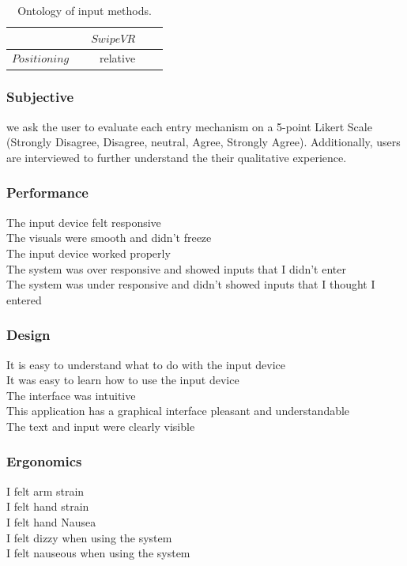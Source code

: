 \begin{table}\centering
{}
\begin{tabular}{@{}rrrrr@{}}\toprule
            &             & $SwipeVR$  \\
\midrule
$Positioning$     &             & relative        \\


\bottomrule
\end{tabular}
\caption{Ontology of input methods.}
\label{table:usability}
\end{table}


\subsubsection{Subjective }
we ask the user to evaluate each entry mechanism on a 5-point Likert Scale (Strongly Disagree, Disagree, neutral, Agree, Strongly Agree).
Additionally, users are  interviewed to further understand the their qualitative experience.

\subsubsection{Performance}
The input device felt responsive\\
The visuals were smooth and didn't freeze\\
The input device worked properly\\
The system was over responsive and showed inputs that I didn't enter\\
The system was under responsive and didn't showed inputs that I thought I entered

\subsubsection{Design}
It is easy to understand what to do with the input device\\
It was easy to learn how to use the input device\\
The interface was intuitive\\
This application has a graphical interface pleasant and understandable\\
The text and input were clearly visible

\subsubsection{Ergonomics}
I felt arm strain\\
I felt hand strain\\
I felt hand Nausea\\
I felt dizzy when using the system\\
I felt nauseous when using the system

